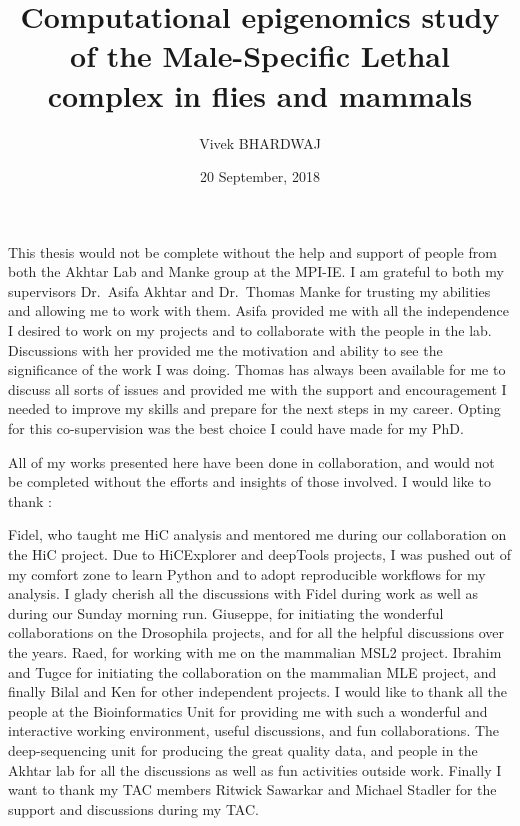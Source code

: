 \documentclass[11pt,twoside]{MPIthesis}
\title{Computational epigenomics study of the Male-Specific Lethal complex in
flies and mammals}
\author{Vivek BHARDWAJ}
\date{20 September, 2018}
\begin{document}
  \maketitle

\makepagetwo

\frontmatter %
\pagestyle{empty} %
  \begin{acknowledgements}
    This thesis would not be complete without the help and support of people
    from both the Akhtar Lab and Manke group at the MPI-IE. I am grateful to
    both my supervisors Dr.~Asifa Akhtar and Dr.~Thomas Manke for trusting
    my abilities and allowing me to work with them. Asifa provided me with
    all the independence I desired to work on my projects and to collaborate
    with the people in the lab. Discussions with her provided me the
    motivation and ability to see the significance of the work I was doing.
    Thomas has always been available for me to discuss all sorts of issues
    and provided me with the support and encouragement I needed to improve
    my skills and prepare for the next steps in my career. Opting for this
    co-supervision was the best choice I could have made for my PhD.
    
    All of my works presented here have been done in collaboration, and
    would not be completed without the efforts and insights of those
    involved. I would like to thank :
    
    Fidel, who taught me HiC analysis and mentored me during our
    collaboration on the HiC project. Due to HiCExplorer and deepTools
    projects, I was pushed out of my comfort zone to learn Python and to
    adopt reproducible workflows for my analysis. I glady cherish all the
    discussions with Fidel during work as well as during our Sunday morning
    run. Giuseppe, for initiating the wonderful collaborations on the
    Drosophila projects, and for all the helpful discussions over the years.
    Raed, for working with me on the mammalian MSL2 project. Ibrahim and
    Tugce for initiating the collaboration on the mammalian MLE project, and
    finally Bilal and Ken for other independent projects. I would like to
    thank all the people at the Bioinformatics Unit for providing me with
    such a wonderful and interactive working environment, useful
    discussions, and fun collaborations. The deep-sequencing unit for
    producing the great quality data, and people in the Akhtar lab for all
    the discussions as well as fun activities outside work. Finally I want
    to thank my TAC members Ritwick Sawarkar and Michael Stadler for the
    support and discussions during my TAC.
  \end{acknowledgements}
  \hypersetup{linkcolor=black}
  \setcounter{tocdepth}{2}
  \tableofcontents
\end{document}
